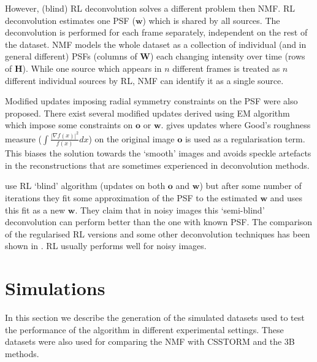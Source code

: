 However, (blind) RL deconvolution solves a different problem then NMF. RL deconvolution estimates one PSF ($\bm{w}$) which is shared by all sources. The deconvolution is performed for each frame separately, independent on the rest of the dataset. NMF models the whole dataset as a collection of individual (and in general different) PSFs (columns of $\bm{W}$) each changing intensity over time (rows of $\bm{H}$). While one source which appears in $n$ different frames is treated as $n$ different individual sources by RL, NMF can identify it as a single source. 

Modified updates imposing radial symmetry constraints on the PSF were also proposed. There exist several modified updates derived using EM algorithm which impose some constraints on $\bm{o}$ or $\bm{w}$. \cite{Joshi:93} gives updates where Good's roughness measure ($\int\frac{\left|\nabla f(x)\right|^{2}}{f(x)}dx$) on the original image $\bm{o}$ is used as a regularisation term. This biases the solution towards the `smooth' images and avoids speckle artefacts in the reconstructions that are sometimes experienced in deconvolution methods. 

\cite{Fish:95} use RL `blind' algorithm (updates on both $\bm{o}$ and $\bm{w}$) but after some number of iterations they fit some approximation of the PSF to the estimated $\bm{w}$ and uses this fit as a new $\bm{w}$. They claim that in noisy images this `semi-blind' deconvolution can perform better than the one with known PSF. The comparison of the regularised RL versions and some other deconvolution techniques has been shown in \cite{Kempen1997BA,Verveer1999}. RL usually performs well for noisy images.


\clearpage
\section{Simulations \label{sec:simulations}}
In this section we describe the generation of the simulated datasets used to test the performance of the algorithm in different experimental settings. These datasets were also used for comparing the NMF with CSSTORM \cite{Zhu2012} and the 3B \cite{Cox2011} methods. 


